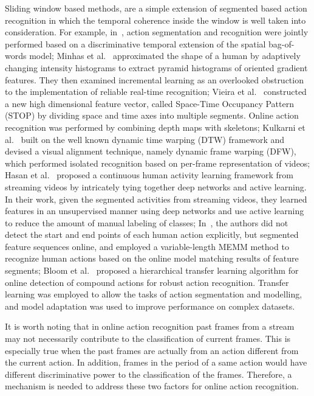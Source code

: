 \documentclass[sigconf]{acmart}
\begin{document}
Sliding window based methods, are a simple extension of segmented based action recognition in which the temporal coherence inside the window is well taken into consideration. For example, in~\cite{hoai2011joint}, action segmentation and recognition were jointly performed based on a discriminative temporal extension of the spatial bag-of-words model; Minhas et al.~\cite{minhas2012incremental} approximated the shape of a human by adaptively changing intensity histograms to extract pyramid histograms of oriented gradient features. They then examined incremental learning as an overlooked obstruction to the implementation of reliable real-time recognition; Vieira et al.~\cite{vieira2014improvement} constructed a new high dimensional feature vector, called Space-Time Occupancy Pattern (STOP) by dividing space and time axes into multiple segments. Online action recognition was performed by combining depth maps with skeletons; Kulkarni et al.~\cite{kulkarni2014continuous} built on the well known dynamic time warping (DTW) framework and devised a visual alignment technique, namely dynamic frame warping (DFW), which performed isolated recognition based on per-frame representation of videos; Hasan et al.~\cite{hasan2014continuous} proposed a continuous human activity learning framework from streaming videos by intricately tying together deep networks and active learning. In their work, given the segmented activities from streaming videos, they learned features in an unsupervised manner using deep networks and use active learning to reduce the amount of manual labeling of classes; In~\cite{zhu2016online}, the authors did not detect the start and end points of each human action explicitly, but segmented feature sequences online, and employed a variable-length MEMM method to recognize human actions based on the online model matching results of feature segments; Bloom et al.~\cite{bloom2016hierarchical} proposed a hierarchical transfer learning algorithm for online detection of compound actions for robust action recognition. Transfer learning was employed to allow the tasks of action segmentation and modelling, and model adaptation was used to improve performance on complex datasets.

It is worth noting that in online action recognition past frames from a stream may not necessarily contribute to the classification of current frames. This is especially true when the past frames are actually from an action different from the current action. In addition, frames in the period of a same action would have different discriminative power to the classification of the frames. Therefore, a mechanism is needed to address these two factors for online action recognition.
\end{document}
